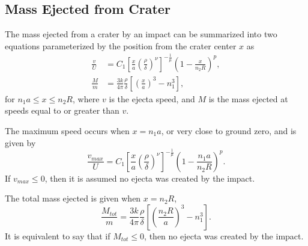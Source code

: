\documentclass{article}
\begin{document}
\subsection{Mass Ejected from Crater}\label{ssec:Mass Ejected from Crater}

The mass ejected from a crater by an impact can be summarized into two equations parameterized by the position from the crater center $x$ as
\begin{align}
\frac{v}{U} &= C_1\left[\frac{x}{a}\left(\frac{\rho}{\delta}\right)^\nu\right]^{-\frac{1}{\mu}}\left(1 - \frac{x}{n_2 R}\right)^p,\\
\frac{M}{m} &= \frac{3k}{4\pi}\frac{\rho}{\delta}\left[\left(\frac{x}{a}\right)^3-n_1^3\right],
\end{align}
for $n_1 a \le x \le n_2 R$, where $v$ is the ejecta speed, and $M$ is the mass ejected at speeds equal to or greater than $v$.

The maximum speed occurs when $x = n_1 a$, or very close to ground zero, and is given by
\begin{equation}
\frac{v_{max}}{U} = C_1\left[\frac{x}{a}\left(\frac{\rho}{\delta}\right)^\nu\right]^{-\frac{1}{\mu}}\left(1 - \frac{n_1 a}{n_2 R}\right)^p.
\end{equation}
If $v_{max} \le 0$, then it is assumed no ejecta was created by the impact.

The total mass ejected is given when $x = n_2 R$,
\begin{equation}
\frac{M_{tot}}{m} = \frac{3k}{4\pi}\frac{\rho}{\delta}\left[\left(\frac{n_2 R}{a}\right)^3-n_1^3\right].
\end{equation}
It is equivalent to say that if $M_{tot} \le 0$, then no ejecta was created by the impact.
\end{document}
